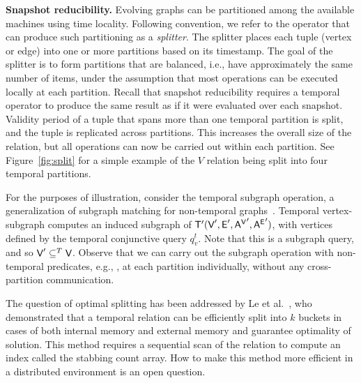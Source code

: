 {\bf Snapshot reducibility.}  Evolving graphs can be partitioned among
the available machines using time locality.  Following convention, we
refer to the operator that can produce such partitioning as a {\em
  splitter}.  The splitter places each tuple (vertex or edge) into one
or more partitions based on its timestamp.  The goal of the splitter
is to form partitions that are balanced, i.e., have approximately the
same number of items, under the assumption that most operations can be
executed locally at each partition.  Recall that snapshot reducibility
requires a temporal operator to produce the same result as if it were
evaluated over each snapshot.  Validity period of a tuple that spans
more than one temporal partition is split, and the tuple is replicated
across partitions.  This increases the overall size of the relation,
but all operations can now be carried out within each partition.  See
Figure~\ref{fig:split} for a simple example of the $V$ relation being
split into four temporal partitions.  

For the purposes of illustration, consider the temporal subgraph
operation, a generalization of subgraph matching for non-temporal
graphs~\cite{PortalarXiv2016}.  Temporal vertex-subgraph
 computes an induced subgraph of \tve $\mathsf{T}'(\textsf{V}',
\textsf{E}', \mathsf{A^{V}}', \mathsf{A^{E}}')$, with vertices defined by the temporal
conjunctive query $q^t_v$.  Note that this is a subgraph query, and so
$\textsf{V}' \subseteq^T \textsf{V}$.  Observe that we can carry out the subgraph
operation with non-temporal predicates, e.g., , at
each partition individually, without any cross-partition
communication.

The question of optimal splitting has been addressed by Le et
al.~\cite{Le2013}, who demonstrated that a temporal relation can be
efficiently split into $k$ buckets in cases of both internal memory
and external memory and guarantee optimality of solution.  This method requires a sequential scan of the relation to
compute an index called the stabbing count array.  How to make this
method more efficient in a distributed environment is an open
question.


